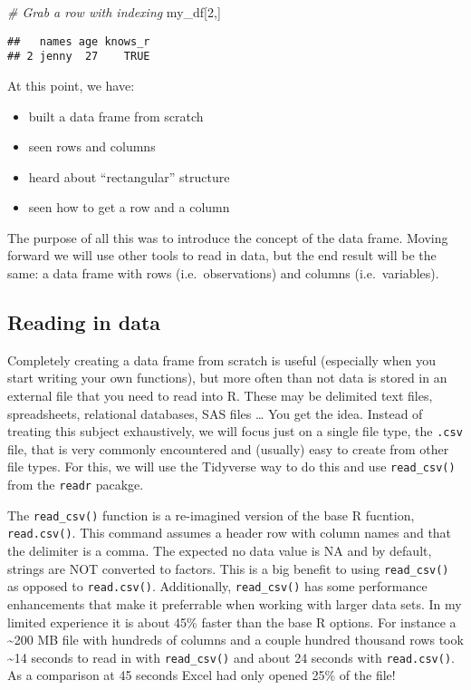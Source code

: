 \documentclass[]{article}
\newenvironment{Shaded}{\begin{snugshade}}{\end{snugshade}}
\newcommand{\CommentTok}[1]{\textcolor[rgb]{0.56,0.35,0.01}{\textit{#1}}}
\newcommand{\DecValTok}[1]{\textcolor[rgb]{0.00,0.00,0.81}{#1}}
\newcommand{\NormalTok}[1]{#1}
\providecommand{\tightlist}{%
  \setlength{\itemsep}{0pt}\setlength{\parskip}{0pt}}
\begin{document}
\begin{Shaded}
\begin{Highlighting}[]
\CommentTok{# Grab a row with indexing}
\NormalTok{my_df[}\DecValTok{2}\NormalTok{,]}
\end{Highlighting}
\end{Shaded}

\begin{verbatim}
##   names age knows_r
## 2 jenny  27    TRUE
\end{verbatim}

At this point, we have:

\begin{itemize}
\tightlist
\item
  built a data frame from scratch
\item
  seen rows and columns
\item
  heard about ``rectangular'' structure
\item
  seen how to get a row and a column
\end{itemize}

The purpose of all this was to introduce the concept of the data frame.
Moving forward we will use other tools to read in data, but the end
result will be the same: a data frame with rows (i.e.~observations) and
columns (i.e.~variables).

\hypertarget{reading-in-data}{%
\subsection{Reading in data}\label{reading-in-data}}

Completely creating a data frame from scratch is useful (especially when
you start writing your own functions), but more often than not data is
stored in an external file that you need to read into R. These may be
delimited text files, spreadsheets, relational databases, SAS files
\ldots{} You get the idea. Instead of treating this subject
exhaustively, we will focus just on a single file type, the
\texttt{.csv} file, that is very commonly encountered and (usually) easy
to create from other file types. For this, we will use the Tidyverse way
to do this and use \texttt{read\_csv()} from the \texttt{readr} pacakge.

The \texttt{read\_csv()} function is a re-imagined version of the base R
fucntion, \texttt{read.csv()}. This command assumes a header row with
column names and that the delimiter is a comma. The expected no data
value is NA and by default, strings are NOT converted to factors. This
is a big benefit to using \texttt{read\_csv()} as opposed to
\texttt{read.csv()}. Additionally, \texttt{read\_csv()} has some
performance enhancements that make it preferrable when working with
larger data sets. In my limited experience it is about 45\% faster than
the base R options. For instance a \textasciitilde200 MB file with
hundreds of columns and a couple hundred thousand rows took
\textasciitilde14 seconds to read in with \texttt{read\_csv()} and about
24 seconds with \texttt{read.csv()}. As a comparison at 45 seconds Excel
had only opened 25\% of the file!
\end{document}
